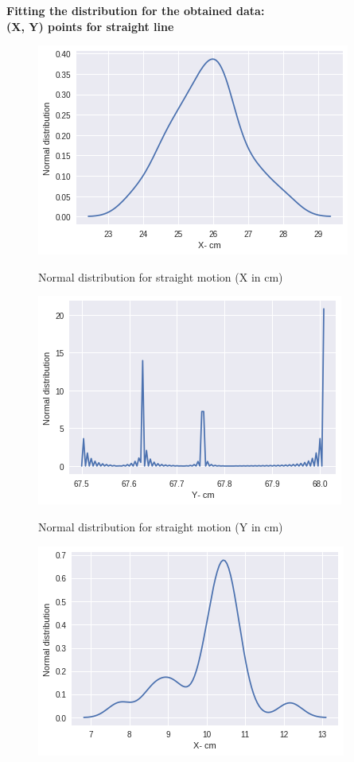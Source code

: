 \documentclass[11pt,a4paper]{article}
\begin{document}
\begin{itemize}
		\newpage
		\textbf{Fitting the distribution for the obtained data: \\ (X, Y) points for straight line}
		\begin{figure}[H]
			\centering	
			\includegraphics[width=0.8\linewidth]{old_straightmotion_kdeplot_X}
			\label{fig:straightG}
			\caption{Normal distribution for straight motion (X in cm)}
		\end{figure}
		\begin{figure}[H]
			\centering	
			\includegraphics[width=0.8\linewidth]{old_straightmotion_kdeplot_Y}
			\label{fig:straightG}
			\caption{Normal distribution for straight motion (Y in cm)}
		\end{figure}
		\begin{figure}[H]
			\centering	
			\includegraphics[width=0.8\linewidth]{old_leftmotion_kdeplot_X}

\end{figure}
\end{itemize}
\end{document}
